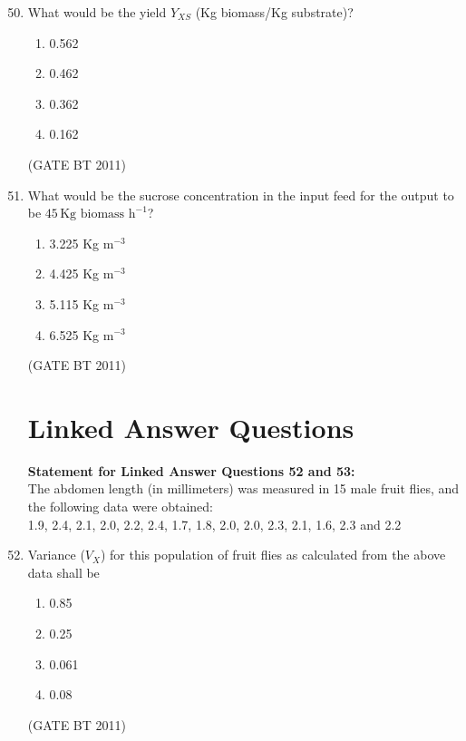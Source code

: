 \documentclass[journal,12pt,onecolumn]{IEEEtran}
\begin{document}
\begin{enumerate}
\setcounter{enumi}{49}

  \item What would be the yield $Y_{XS}$ (Kg biomass/Kg substrate)?
 
    \begin{multicols}{4}
        \begin{enumerate}
      \item 0.562
      \item 0.462
      \item 0.362
      \item 0.162
     \end{enumerate}
    \end{multicols}\hfill(GATE BT 2011)

  \item What would be the sucrose concentration in the input feed for the output to be $45 \, \text{Kg biomass h}^{-1}$?

  \begin{multicols}{4}
    \begin{enumerate}
      \item 3.225 Kg m$^{-3}$
      \item 4.425 Kg m$^{-3}$
      \item 5.115 Kg m$^{-3}$
      \item 6.525 Kg m$^{-3}$
    \end{enumerate}
  \end{multicols} \hfill(GATE BT 2011)

\section*{Linked Answer Questions}

\textbf{Statement for Linked Answer Questions 52 and 53:} \\
The abdomen length (in millimeters) was measured in 15 male fruit flies, and the following data were obtained: \\
1.9, 2.4, 2.1, 2.0, 2.2, 2.4, 1.7, 1.8, 2.0, 2.0, 2.3, 2.1, 1.6, 2.3 and 2.2



  \item Variance ($V_X$) for this population of fruit flies as calculated from the above data shall be

  \begin{multicols}{4}
    \begin{enumerate}
      \item 0.85
      \item 0.25
      \item 0.061
      \item 0.08
    \end{enumerate}
  \end{multicols} \hfill(GATE BT 2011)


\end{enumerate}
\end{document}
